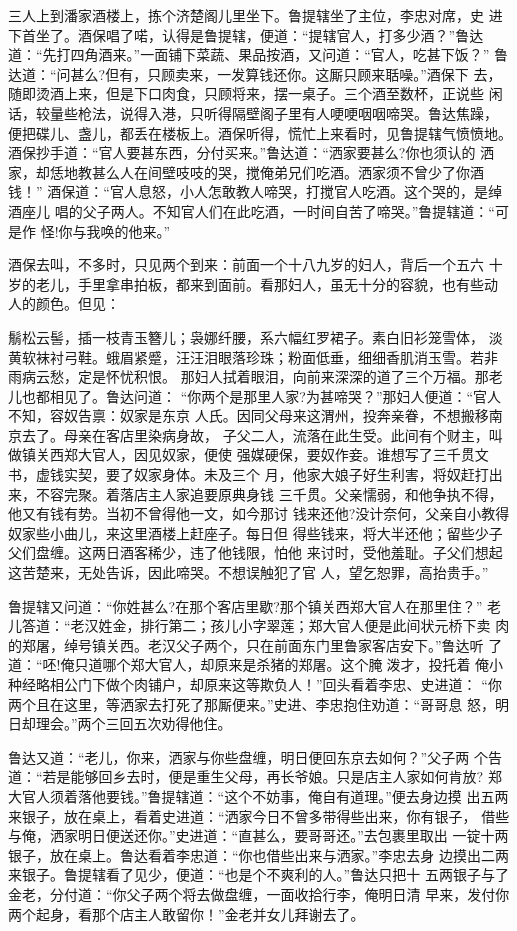 三人上到潘家酒楼上，拣个济楚阁儿里坐下。鲁提辖坐了主位，李忠对席，史
进下首坐了。酒保唱了喏，认得是鲁提辖，便道：“提辖官人，打多少酒？”鲁达
道：“先打四角酒来。”一面铺下菜蔬、果品按酒，又问道：“官人，吃甚下饭？”
鲁达道：“问甚么?但有，只顾卖来，一发算钱还你。这厮只顾来聒噪。”酒保下
去，随即烫酒上来，但是下口肉食，只顾将来，摆一桌子。三个酒至数杯，正说些
闲话，较量些枪法，说得入港，只听得隔壁阁子里有人哽哽咽咽啼哭。鲁达焦躁，
便把碟儿、盏儿，都丢在楼板上。酒保听得，慌忙上来看时，见鲁提辖气愤愤地。
酒保抄手道：“官人要甚东西，分付买来。”鲁达道：“洒家要甚么?你也须认的
洒家，却恁地教甚么人在间壁吱吱的哭，搅俺弟兄们吃酒。洒家须不曾少了你酒钱！”
酒保道：“官人息怒，小人怎敢教人啼哭，打搅官人吃酒。这个哭的，是绰酒座儿
唱的父子两人。不知官人们在此吃酒，一时间自苦了啼哭。”鲁提辖道：“可是作
怪!你与我唤的他来。”

酒保去叫，不多时，只见两个到来：前面一个十八九岁的妇人，背后一个五六
十岁的老儿，手里拿串拍板，都来到面前。看那妇人，虽无十分的容貌，也有些动
人的颜色。但见：

鬅松云髻，插一枝青玉簪儿；袅娜纤腰，系六幅红罗裙子。素白旧衫笼雪体，
淡黄软袜衬弓鞋。蛾眉紧蹙，汪汪泪眼落珍珠；粉面低垂，细细香肌消玉雪。若非
雨病云愁，定是怀忧积恨。
那妇人拭着眼泪，向前来深深的道了三个万福。那老儿也都相见了。鲁达问道：
“你两个是那里人家?为甚啼哭？”那妇人便道：“官人不知，容奴告禀：奴家是东京
人氏。因同父母来这渭州，投奔亲眷，不想搬移南京去了。母亲在客店里染病身故，
子父二人，流落在此生受。此间有个财主，叫做镇关西郑大官人，因见奴家，便使
强媒硬保，要奴作妾。谁想写了三千贯文书，虚钱实契，要了奴家身体。未及三个
月，他家大娘子好生利害，将奴赶打出来，不容完聚。着落店主人家追要原典身钱
三千贯。父亲懦弱，和他争执不得，他又有钱有势。当初不曾得他一文，如今那讨
钱来还他?没计奈何，父亲自小教得奴家些小曲儿，来这里酒楼上赶座子。每日但
得些钱来，将大半还他；留些少子父们盘缠。这两日酒客稀少，违了他钱限，怕他
来讨时，受他羞耻。子父们想起这苦楚来，无处告诉，因此啼哭。不想误触犯了官
人，望乞恕罪，高抬贵手。”

鲁提辖又问道：“你姓甚么?在那个客店里歇?那个镇关西郑大官人在那里住？”
老儿答道：“老汉姓金，排行第二；孩儿小字翠莲；郑大官人便是此间状元桥下卖
肉的郑屠，绰号镇关西。老汉父子两个，只在前面东门里鲁家客店安下。”鲁达听
了道：“呸!俺只道哪个郑大官人，却原来是杀猪的郑屠。这个腌泼才，投托着
俺小种经略相公门下做个肉铺户，却原来这等欺负人！”回头看着李忠、史进道：
“你两个且在这里，等洒家去打死了那厮便来。”史进、李忠抱住劝道：“哥哥息
怒，明日却理会。”两个三回五次劝得他住。

鲁达又道：“老儿，你来，洒家与你些盘缠，明日便回东京去如何？”父子两
个告道：“若是能够回乡去时，便是重生父母，再长爷娘。只是店主人家如何肯放?
郑大官人须着落他要钱。”鲁提辖道：“这个不妨事，俺自有道理。”便去身边摸
出五两来银子，放在桌上，看着史进道：“洒家今日不曾多带得些出来，你有银子，
借些与俺，洒家明日便送还你。”史进道：“直甚么，要哥哥还。”去包裹里取出
一锭十两银子，放在桌上。鲁达看着李忠道：“你也借些出来与洒家。”李忠去身
边摸出二两来银子。鲁提辖看了见少，便道：“也是个不爽利的人。”鲁达只把十
五两银子与了金老，分付道：“你父子两个将去做盘缠，一面收拾行李，俺明日清
早来，发付你两个起身，看那个店主人敢留你！”金老并女儿拜谢去了。


